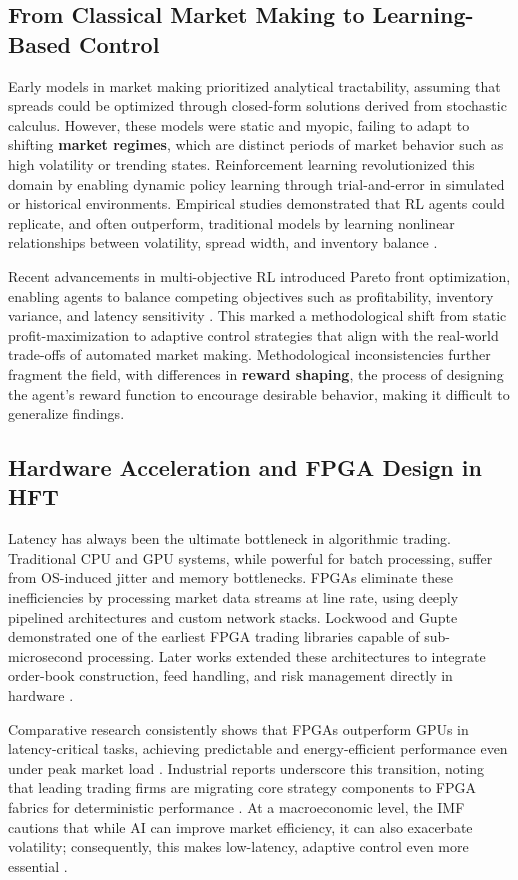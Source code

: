 \subsection{From Classical Market Making to Learning-Based Control}
Early models in market making prioritized analytical tractability, assuming that spreads could be optimized through closed-form solutions derived from stochastic calculus. However, these models were static and myopic, failing to adapt to shifting \textbf{market regimes}, which are distinct periods of market behavior such as high volatility or trending states. Reinforcement learning revolutionized this domain by enabling dynamic policy learning through trial-and-error in simulated or historical environments. Empirical studies demonstrated that RL agents could replicate, and often outperform, traditional models by learning nonlinear relationships between volatility, spread width, and inventory balance \citep{Spooner2020,Patel2022,Kumar2023,Vakkilainen2023}. 

Recent advancements in multi-objective RL introduced Pareto front optimization, enabling agents to balance competing objectives such as profitability, inventory variance, and latency sensitivity \citep{Li2025}. This marked a methodological shift from static profit-maximization to adaptive control strategies that align with the real-world trade-offs of automated market making. Methodological inconsistencies further fragment the field, with differences in \textbf{reward shaping}, the process of designing the agent's reward function to encourage desirable behavior, making it difficult to generalize findings.

\subsection{Hardware Acceleration and FPGA Design in HFT}
Latency has always been the ultimate bottleneck in algorithmic trading. Traditional CPU and GPU systems, while powerful for batch processing, suffer from OS-induced jitter and memory bottlenecks. FPGAs eliminate these inefficiencies by processing market data streams at line rate, using deeply pipelined architectures and custom network stacks. Lockwood and Gupte \citep{Lockwood2012} demonstrated one of the earliest FPGA trading libraries capable of sub-microsecond processing. Later works extended these architectures to integrate order-book construction, feed handling, and risk management directly in hardware \citep{Gupta2024,AlAhmed2024}. 

Comparative research consistently shows that FPGAs outperform GPUs in latency-critical tasks, achieving predictable and energy-efficient performance even under peak market load \citep{Shams2024}. Industrial reports underscore this transition, noting that leading trading firms are migrating core strategy components to FPGA fabrics for deterministic performance \citep{GlobalBanking2025}. At a macroeconomic level, the IMF cautions that while AI can improve market efficiency, it can also exacerbate volatility; consequently, this makes low-latency, adaptive control even more essential \citep{IMF2024}.

